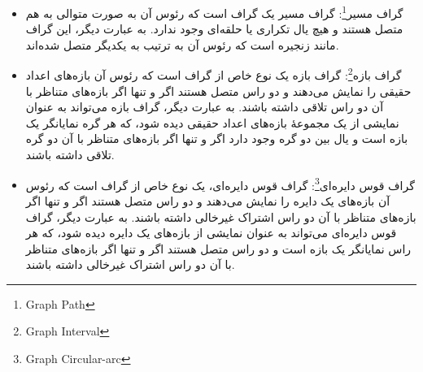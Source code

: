 \documentclass[a4paper,10pt]{article}
\begin{document}
\begin{itemize}
\begin{center}

        \end{center}
        
        \item گراف مسیر\footnote{\hspace{2pt}Graph Path}: گراف مسیر یک گراف است که رئوس آن به صورت متوالی به هم متصل هستند و هیچ یال تکراری یا حلقه‌ای وجود ندارد. به عبارت دیگر، این گراف مانند زنجیره است که رئوس آن به ترتیب به یکدیگر متصل شده‌اند.
        
        \item گراف بازه\footnote{\hspace{2pt}Graph Interval}: گراف بازه یک نوع خاص از گراف است که رئوس آن بازه‌های اعداد حقیقی را نمایش می‌دهند و دو راس متصل هستند اگر و تنها اگر بازه‌های متناظر با آن دو راس تلاقی داشته باشند. به عبارت دیگر، گراف بازه می‌تواند به عنوان نمایشی از یک مجموعهٔ بازه‌های اعداد حقیقی دیده شود، که هر گره نمایانگر یک بازه است و یال بین دو گره وجود دارد اگر و تنها اگر بازه‌های متناظر با آن دو گره تلاقی داشته باشند.
        
        \item گراف قوس دایره‌ای\footnote{\hspace{2pt}Graph Circular-arc}: گراف قوس دایره‌ای، یک نوع خاص از گراف است که رئوس آن بازه‌های یک دایره را نمایش می‌دهند و دو راس متصل هستند اگر و تنها اگر بازه‌های متناظر با آن دو راس اشتراک غیرخالی داشته باشند. به عبارت دیگر، گراف قوس دایره‌ای می‌تواند به عنوان نمایشی از بازه‌های یک دایره دیده شود، که هر راس نمایانگر یک بازه است و دو راس متصل هستند اگر و تنها اگر بازه‌های متناظر با آن دو راس اشتراک غیرخالی داشته باشند.
        

\end{itemize}
\end{document}
